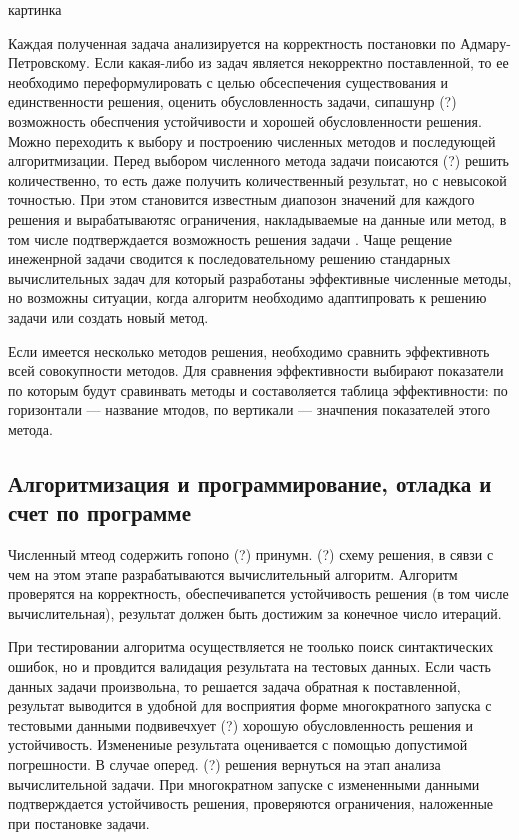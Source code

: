 \documentclass[12pt]{article}
\begin{document}
\begin{center}
    картинка
\end{center}

Каждая полученная задача анализируется на корректность постановки по Адмару-Петровскому. Если какая-либо из задач является некорректно поставленной, то ее необходимо переформулировать с целью обсеспечения существования и единственности решения, оценить обусловленность задачи, сипашунр (?) возможность обеспчения устойчивости и хорошей обусловленности решения. Можно переходить к выбору и построению численных методов и последующей алгоритмизации. Перед выбором численного метода задачи поисаются (?) решить количественно, то есть даже получить количественный результат, но с невысокой точностью. При этом становится известным диапозон значений для каждого решения и вырабатываютяс ограничения, накладываемые на данные или метод, в том числе подтверждается возможность решения задачи . Чаще рещение инеженрной задачи сводится к последовательному решению стандарных вычислительных задач для который разработаны эффективные численные методы, но возможны ситуации, когда алгоритм необходимо адаптипровать к решению задачи или создать новый метод.

Если имеется несколько методов решения, необходимо сравнить эффективноть всей совокупности методов. Для сравнения эффективности выбирают показатели по которым будут сравинвать методы и составоляется таблица эффективности: по горизонтали --- название мтодов, по вертикали --- значпения показателей этого метода.

\subsection{Алгоритмизация и программирование, отладка и счет по программе}

Численный мтеод содержить гопоно (?) принумн. (?) схему решения, в сявзи с чем на этом этапе разрабатываются вычислительный алгоритм. Алгоритм проверятся на корректность, обеспечивапется устойчивость решения (в том числе вычислительная), результат должен быть достижим за конечное число итераций.

При тестировании алгоритма осуществляется не тоолько поиск синтактических ошибок, но и провдится валидация результата на тестовых данных. Если часть данных задачи произвольна, то решается задача обратная к поставленной, результат выводится в удобной для восприятия форме многократного запуска с тестовыми данными подвивечхует (?) хорошую обусловленность решения и устойчивость. Изменениые результата оценивается с помощью допустимой погрешности. В случае оперед. (?) решения вернуться на этап анализа вычислительной задачи. При многократном запуске с измененными данными подтверждается устойчивость решения, проверяются ограничения, наложенные при постановке задачи.
\end{document}
